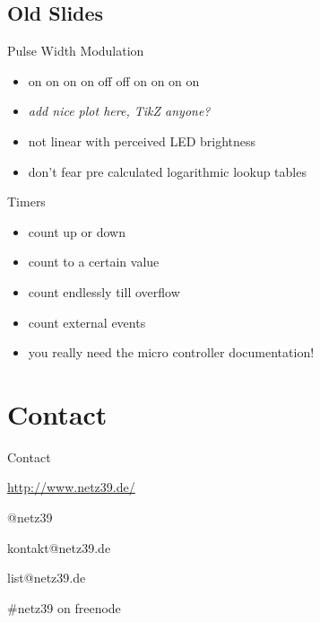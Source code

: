 \documentclass{beamer}
\begin{document}
\subsection{Old Slides}

\begin{frame}{Pulse Width Modulation}
    \begin{itemize}
        \item on on on on off off on on on on
        \pause
        \item \emph{add nice plot here, TikZ anyone?}
        \pause
        \item not linear with perceived LED brightness
        \item don't fear pre calculated logarithmic lookup tables
    \end{itemize}
\end{frame}

\begin{frame}{Timers}
    \begin{itemize}
        \item count up or down
        \item count to a certain value
        \item count endlessly till overflow
        \item count external events
        \pause
        \item you really need the micro controller documentation!
    \end{itemize}
\end{frame}

\section{Contact}

\begin{frame}{Contact}
    \begin{center}
        \begin{description}
            \item[WWW] \url{http://www.netz39.de/}
            \item[Twitter/identi.ca] @netz39
            \item[E-Mail] kontakt@netz39.de
            \item[Mailingliste] list@netz39.de
            \item[IRC] \#netz39 on freenode
        \end{description}
    \end{center}
\end{frame}
\end{document}
